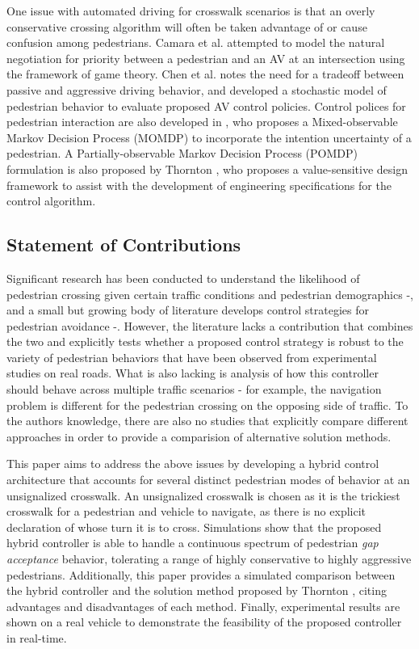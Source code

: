 \documentclass[letterpaper, 10 pt, conference]{ieeeconf}  %
\begin{document}
One issue with automated driving for crosswalk scenarios is that an overly conservative crossing algorithm will often be taken advantage of or cause confusion among pedestrians\cite{Camara2018}. Camara et al. \cite{Camara2018} attempted to model the natural negotiation for priority between a pedestrian and an AV at an intersection using the framework of game theory. Chen et al. \cite{Chen} notes the need for a tradeoff between passive and aggressive driving behavior, and developed a stochastic model of pedestrian behavior to evaluate proposed AV control policies. Control polices for pedestrian interaction are also developed in \cite{Bandyopadhyay}, who proposes a Mixed-observable Markov Decision Process (MOMDP) to incorporate the intention uncertainty of a pedestrian. A Partially-observable Markov Decision Process (POMDP) formulation is also proposed by Thornton \cite{Thornton2018}, who proposes a value-sensitive design framework to assist with the development of engineering specifications for the control algorithm. 

\subsection{Statement of Contributions}
Significant research has been conducted to understand the likelihood of pedestrian crossing given certain traffic conditions and pedestrian demographics \cite{Schroeder2011} -\cite{Lee2005}, and a small but growing body of literature develops control strategies for pedestrian avoidance \cite{Bandyopadhyay}-\cite{Thornton2018}. However, the literature lacks a contribution that combines the two and explicitly  tests whether a proposed control strategy is robust to the variety of pedestrian behaviors that have been observed from experimental studies on real roads. What is also lacking is analysis of how this controller should behave across multiple traffic scenarios - for example, the navigation problem is different for the pedestrian crossing on the opposing side of traffic. To the authors knowledge, there are also no studies that explicitly compare different approaches in order to provide a comparision of alternative solution methods.  

This paper aims to address the above issues by developing a hybrid control architecture that accounts for several distinct pedestrian modes of behavior at an unsignalized crosswalk. An unsignalized crosswalk is chosen as it is the trickiest crosswalk for a pedestrian and vehicle to navigate, as there is no explicit declaration of whose turn it is to cross. Simulations show that the proposed hybrid controller is able to handle a continuous spectrum of pedestrian \textit{gap acceptance} behavior, tolerating a range of highly conservative to highly aggressive pedestrians. Additionally, this paper provides a simulated comparison between the hybrid controller and the solution method proposed by Thornton \cite{Thornton2018}, citing advantages and disadvantages of each method. Finally, experimental results are shown on a real vehicle to demonstrate the feasibility of the proposed controller in real-time. 
\end{document}
